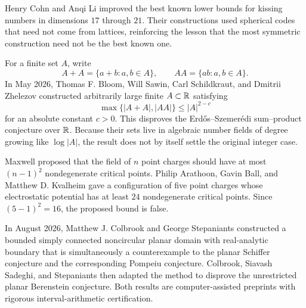     \begin{fact}
        Henry Cohn and Anqi Li improved the best known lower bounds for kissing
        numbers in dimensions $17$ through $21$. Their constructions used
        spherical codes that need not come from lattices, reinforcing the lesson
        that the most symmetric construction need not be the best known one.
    \end{fact}

    \begin{fact}
        For a finite set $A$, write
        \[
            A+A=\{a+b:a,b\in A\},
            \qquad
            AA=\{ab:a,b\in A\}.
        \]
        In May 2026, Thomas F. Bloom, Will Sawin, Carl Schildkraut, and Dmitrii
        Zhelezov constructed arbitrarily large finite $A\subset\mathbb{R}$ satisfying
        \[
            \max\{|A+A|,|AA|\}\leq |A|^{2-c}
        \]
        for an absolute constant $c>0$. This disproves the Erd\H{o}s--Szemer\'edi
        sum--product conjecture over $\mathbb{R}$. Because their sets live in algebraic
        number fields of degree growing like $\log|A|$, the result does not by
        itself settle the original integer case.
    \end{fact}

    \begin{fact}
        Maxwell proposed that the field of $n$ point charges should have at most
        $(n-1)^2$ nondegenerate critical points. Philip Arathoon, Gavin Ball, and
        Matthew D. Kvalheim gave a configuration of five point charges whose
        electrostatic potential has at least $24$ nondegenerate critical points.
        Since $(5-1)^2=16$, the proposed bound is false.
    \end{fact}

    \begin{fact}
        In August 2026, Matthew J. Colbrook and George Stepaniants constructed a
        bounded simply connected noncircular planar domain with real-analytic
        boundary that is simultaneously a counterexample to the planar Schiffer
        conjecture and the corresponding Pompeiu conjecture. Colbrook, Siavash
        Sadeghi, and Stepaniants then adapted the method to disprove the
        unrestricted planar Berenstein conjecture. Both results are
        computer-assisted preprints with rigorous interval-arithmetic
        certification.
    \end{fact}

